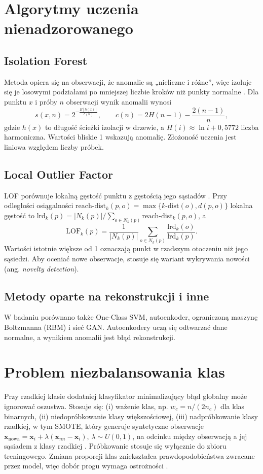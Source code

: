\section{Algorytmy uczenia nienadzorowanego}
\subsection{Isolation Forest}
Metoda opiera się na obserwacji, że anomalie są „nieliczne i różne”, więc izoluje się je losowymi podziałami po mniejszej liczbie kroków niż punkty normalne \cite{liu2008}. Dla punktu $x$ i próby $n$ obserwacji wynik anomalii wynosi
\begin{equation}
  s(x,n)=2^{-\frac{E[h(x)]}{c(n)}},\qquad c(n)=2H(n-1)-\frac{2(n-1)}{n},
\end{equation}
gdzie $h(x)$ to długość ścieżki izolacji w drzewie, a $H(i)\approx\ln i+0{,}5772$ liczba harmoniczna. Wartości bliskie 1 wskazują anomalię. Złożoność uczenia jest liniowa względem liczby próbek.

\subsection{Local Outlier Factor}
LOF porównuje lokalną gęstość punktu z gęstością jego sąsiadów \cite{breunig2000}. Przy odległości osiągalności $\text{reach-dist}_k(p,o)=\max\{k\text{-dist}(o),d(p,o)\}$ lokalna gęstość to $\text{lrd}_k(p)=|N_k(p)|/\sum_{o\in N_k(p)}\text{reach-dist}_k(p,o)$, a
\begin{equation}
  \text{LOF}_k(p)=\frac{1}{|N_k(p)|}\sum_{o\in N_k(p)}\frac{\text{lrd}_k(o)}{\text{lrd}_k(p)}.
\end{equation}
Wartości istotnie większe od 1 oznaczają punkt w rzadszym otoczeniu niż jego sąsiedzi. Aby oceniać nowe obserwacje, stosuje się wariant wykrywania nowości (ang. \emph{novelty detection}).

\subsection{Metody oparte na rekonstrukcji i inne}
W badaniu \cite{niu2019} porównano także One-Class SVM, autoenkoder, ograniczoną maszynę Boltzmanna (RBM) i sieć GAN. Autoenkodery uczą się odtwarzać dane normalne, a wynikiem anomalii jest błąd rekonstrukcji. 

\section{Problem niezbalansowania klas}
Przy rzadkiej klasie dodatniej klasyfikator minimalizujący błąd globalny może ignorować oszustwa. Stosuje się: (i) ważenie klas, np. $w_c=n/(2n_c)$ dla klas binarnych, (ii) niedopróbkowanie klasy większościowej, (iii) nadpróbkowanie klasy rzadkiej, w tym SMOTE, który generuje syntetyczne obserwacje $\mathbf{x}_{\text{nowa}}=\mathbf{x}_i+\lambda(\mathbf{x}_{nn}-\mathbf{x}_i)$, $\lambda\sim U(0,1)$, na odcinku między obserwacją a jej sąsiadem z klasy rzadkiej \cite{chawla2002}. Próbkowanie stosuje się wyłącznie do zbioru treningowego. Zmiana proporcji klas zniekształca prawdopodobieństwa zwracane przez model, więc dobór progu wymaga ostrożności \cite{dalpozzolo2018}.

